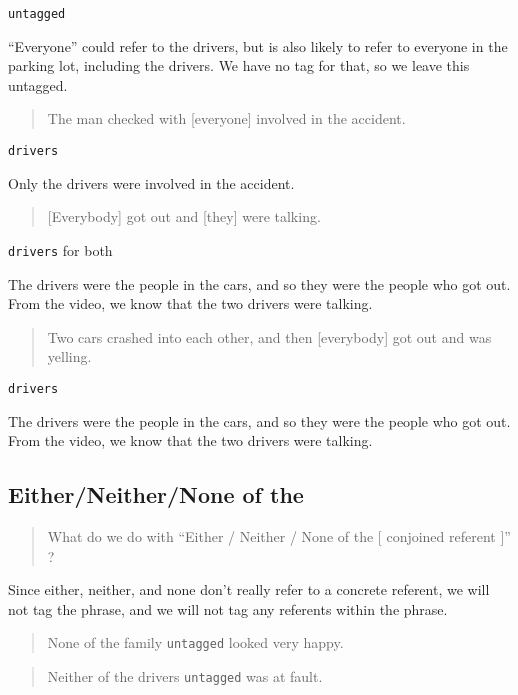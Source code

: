 \documentclass[
]{book}
\begin{document}
\texttt{untagged}

``Everyone'' could refer to the drivers,
but is also likely to refer to everyone in the parking lot,
including the drivers.
We have no tag for that, so we leave this untagged.

\begin{quote}
The man checked with {[}everyone{]} involved in the accident.
\end{quote}

\texttt{drivers}

Only the drivers were involved in the accident.

\begin{quote}
{[}Everybody{]} got out and {[}they{]} were talking.
\end{quote}

\texttt{drivers} for both

The drivers were the people in the cars,
and so they were the people who got out.
From the video, we know that the two drivers were talking.

\begin{quote}
Two cars crashed into each other,
and then {[}everybody{]} got out and was yelling.
\end{quote}

\texttt{drivers}

The drivers were the people in the cars,
and so they were the people who got out.
From the video, we know that the two drivers were talking.

\hypertarget{eitherneithernone-of-the}{%
\subsection{Either/Neither/None of the}\label{eitherneithernone-of-the}}

\begin{quote}
What do we do with
``Either / Neither / None of the {[} conjoined referent {]}'' ?
\end{quote}

Since either, neither, and none don't really refer to a concrete referent,
we will not tag the phrase,
and we will not tag any referents within the phrase.

\begin{quote}
None of the family \texttt{untagged} looked very happy.
\end{quote}

\begin{quote}
Neither of the drivers \texttt{untagged} was at fault.
\end{quote}
\end{document}
